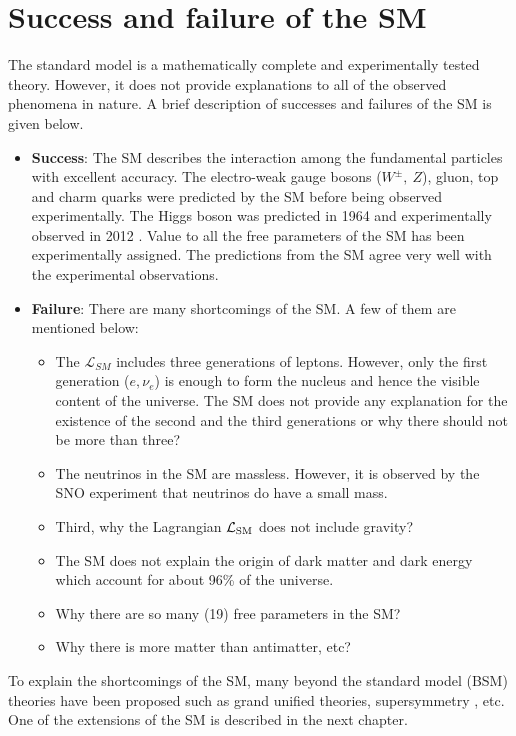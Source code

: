 \section{Success and failure of the SM}
\label{s:meritSM}
The standard model is a mathematically complete and experimentally tested theory.
However, it does not provide explanations to all of the observed phenomena in
nature. A brief description of successes and failures of the SM is given below.
\begin{itemize}[leftmargin=*]
				\item \textbf{Success}: The SM describes the interaction among the 
								fundamental particles with excellent accuracy. The electro-weak
								gauge bosons ($W^\pm, ~Z$), gluon, top and charm quarks were
								predicted by the SM before being observed experimentally. The
								Higgs boson was predicted in 1964 and experimentally observed in
								2012 \cite{Aad:2015zhl}. Value to all the free parameters of the 
								SM has been experimentally assigned. The predictions from the SM 
								agree very well with the experimental observations.

\item \textbf{Failure}:
There are many shortcomings of the SM. A few of them are mentioned below:  
\begin{itemize}[leftmargin=*]
\item The $\mathcal{L}_{SM}$ includes 
three generations of leptons. However, only the first generation ($e, \nu_e$) is 
enough to form the nucleus and hence the visible content of the universe. The SM
does not provide any explanation for the existence of the second and the third
generations or why there should not be more than three?
\item The neutrinos in the SM are massless. However, it is observed by 
the SNO experiment that neutrinos do have a small mass. 
\item Third, why the Lagrangian $\mathcal{L}_{\rm{SM}}$ does not 
include gravity?
\item The SM does not explain the origin of dark matter \cite{Ade:2013zuv,
Ade:2013sjv} and dark energy which account for about 96\% of the universe. 
\item Why there are so many (19) free parameters in the SM? 
\item Why there is more matter than antimatter, etc? 
\end{itemize}
\end{itemize}
To explain the shortcomings of the SM, many beyond the standard model (BSM) 
theories have been proposed such as grand unified theories, supersymmetry 
\cite{Martin:1997ns}, etc. One of the extensions of the SM is described in the 
next chapter.
